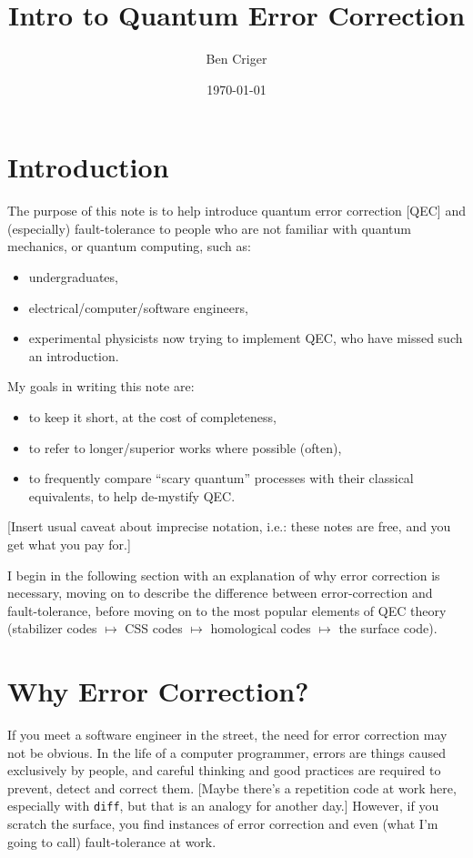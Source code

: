 \documentclass[10pt,a4paper, english]{scrartcl}
\title{Intro to Quantum Error Correction}
\author{Ben Criger}
\date{\today}
\begin{document}
\maketitle
\section{Introduction}
The purpose of this note is to help introduce quantum error correction [QEC] and (especially) fault-tolerance to people who are not familiar with quantum mechanics, or quantum computing, such as:
\begin{itemize}
\item undergraduates,
\item electrical/computer/software engineers,
\item experimental physicists now trying to implement QEC, who have missed such an introduction.
\end{itemize}
My goals in writing this note are:
\begin{itemize}
\item to keep it short, at the cost of completeness,
\item to refer to longer/superior works where possible (often),
\item to frequently compare ``scary quantum'' processes with their classical equivalents, to help de-mystify QEC.
\end{itemize}
[Insert usual caveat about imprecise notation, i.e.: these notes are free, and you get what you pay for.]

I begin in the following section with an explanation of why error correction is necessary, moving on to describe the difference between error-correction and fault-tolerance, before moving on to the most popular elements of QEC theory (stabilizer codes $\mapsto$ CSS codes $\mapsto$ homological codes $\mapsto$ the surface code). 
\section{Why Error Correction?}
If you meet a software engineer in the street, the need for error correction may not be obvious. 
In the life of a computer programmer, errors are things caused exclusively by people, and careful thinking and good practices are required to prevent, detect and correct them. 
[Maybe there's a repetition code at work here, especially with \texttt{diff}, but that is an analogy for another day.]
However, if you scratch the surface, you find instances of error correction and even (what I'm going to call) fault-tolerance at work. 
\end{document}
